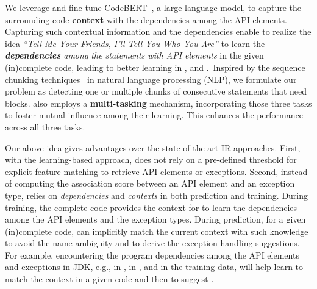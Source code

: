 We leverage and fine-tune CodeBERT~\cite{codebert-emnlp20}, a large
language model, to capture the surrounding code {\bf context} with the
dependencies among the API elements. Capturing such contextual
information and the dependencies enable {\tool} to realize the idea
{\em ``Tell Me Your Friends, I'll Tell You Who You Are''} to learn the
{\em {\bf dependencies} among the statements with API elements} in the
given (in)complete code, leading to better learning in {\xblock},
{\xstate} and {\xtype}.~Inspired by the sequence chunking
techniques~\cite{sequence-chunking-aaai17} in natural language
processing (NLP), we formulate our problem as detecting one or
multiple chunks of consecutive statements that need 
blocks. {\tool} also employs a {\bf multi-tasking} mechanism,
incorporating those three tasks to foster mutual influence among their
learning. This enhances the performance across all three
tasks.



Our above idea gives {\tool} advantages over the state-of-the-art IR
approaches. First, with the learning-based approach, {\tool} does not
rely on a pre-defined threshold for explicit feature matching to
retrieve API elements or exceptions. Second,
instead of computing the association score between an API element and
an exception type,
{\tool} relies on {\em dependencies} and {\em contexts}
in both prediction and training. During training, the complete code
provides the context for {\tool} to learn the dependencies among the
API elements and the exception types. During prediction, for a given
(in)complete code, {\tool} can implicitly match the current context
with such knowledge to avoid the name ambiguity and to derive the
exception handling suggestions.
%
For example, encountering the program dependencies among the API
elements and exceptions in JDK, e.g.,  in
,  in
, and
 in the training data, will help
     {\tool} learn to match the context in a given code and then to suggest
     .

